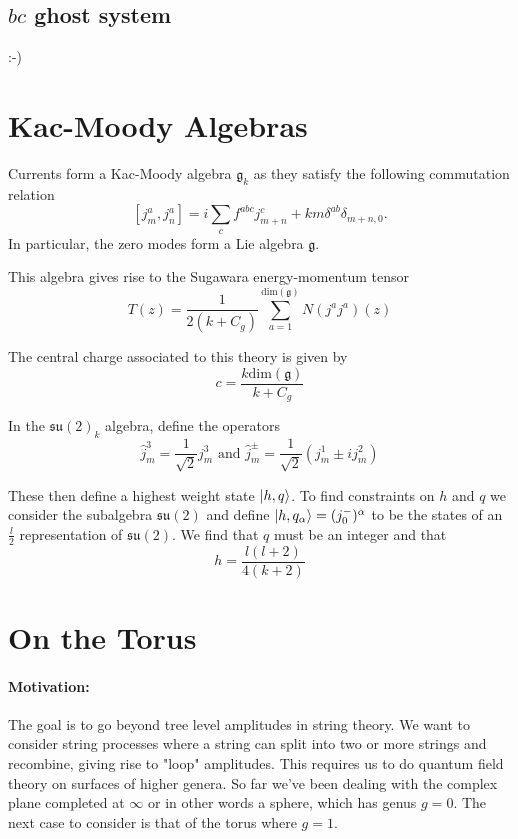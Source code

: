 \documentclass{article}
\begin{document}
\subsection{$bc$ ghost system}
:-)

\section{Kac-Moody Algebras}

Currents form a Kac-Moody algebra $\mathfrak{g}_k$ as they satisfy the following commutation relation $$[j_m^a,j_n^a]=i \sum_cf^{abc}j_{m+n}^c+km\delta^{ab}\delta_{m+n,0}.$$ In particular, the zero modes form a Lie algebra $\mathfrak{g}$. 

This algebra gives rise to the Sugawara energy-momentum tensor $$T(z)=\frac{1}{2(k+C_g)}\sum_{a=1}^{\text{dim}(\mathfrak{g})}N(j^aj^a)(z)$$

The central charge associated to this theory is given by $$c=\frac{k \text{dim}(\mathfrak{g})}{k+C_g}$$

In the $\mathfrak{su}(2)_k$ algebra, define the operators $$\hat{j}^3_m=\frac{1}{\sqrt{2}}j_m^3 \text{ and } \hat{j}^{\pm}_m=\frac{1}{\sqrt{2}}(j^1_m\pm ij^2_m)$$

These then define a highest weight state $\ket{h,q}$. To find constraints on $h$ and $q$ we consider the subalgebra $\mathfrak{su}(2)$ and define $\ket{h,q_{\alpha}}=(j_0^-)^{\alpha}$ to be the states of an $\frac{l}{2}$ representation of $\mathfrak{su}(2)$. We find that $q$ must be an integer and that $$h=\frac{l(l+2)}{4(k+2)}$$

\section{On the Torus}
\paragraph{Motivation:} The goal is to go beyond tree level amplitudes in
string theory. We want to consider string processes where a string can split
into two or more strings and recombine, giving rise to "loop" amplitudes. This
requires us to do quantum field theory on surfaces of higher genera. So far
we've been dealing with the complex plane completed at \( \infty \) or in other
words a sphere, which has genus \( g = 0 \). The next case to consider is that of
the torus where \( g=1 \).
\end{document}
